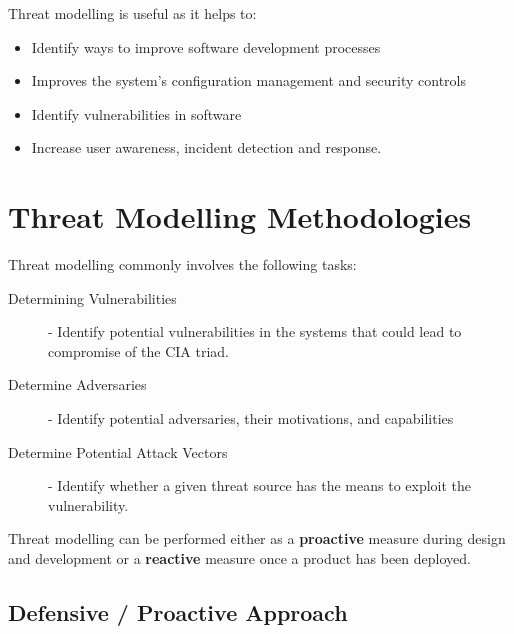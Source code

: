 \documentclass[12pt letter]{report}
\begin{document}
Threat modelling is useful as it helps to:
\begin{itemize}
  \item Identify ways to improve software development processes
  \item Improves the system's configuration management and security controls
  \item Identify vulnerabilities in software
  \item Increase user awareness, incident detection and response.
\end{itemize}

\section{Threat Modelling Methodologies}

Threat modelling commonly involves the following tasks:
\begin{description}
  \item[Determining Vulnerabilities]  - Identify potential
    vulnerabilities in the systems that could lead to compromise of
    the CIA triad.
  \item[Determine Adversaries] - Identify potential adversaries,
    their motivations, and capabilities
  \item[Determine Potential Attack Vectors] - Identify whether a
    given threat source has the means to exploit the vulnerability.
\end{description}


Threat modelling can be performed either as a \textbf{proactive}
measure during design and development or a \textbf{reactive} measure
once a product has been deployed.

\subsection{Defensive / Proactive Approach}
\end{document}
